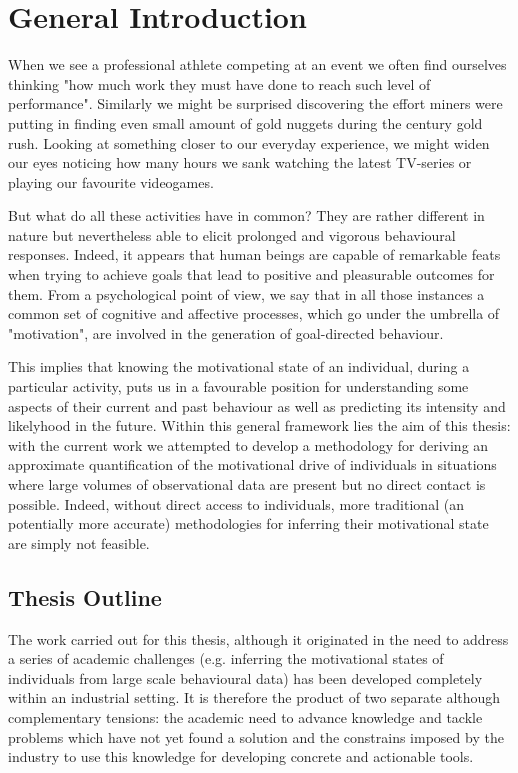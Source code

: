 \chapter{General Introduction}
\label{chapter_general_intro}

When we see a professional athlete competing at an event we often find ourselves thinking "how much work they must have done to reach such level of performance". Similarly we might be surprised discovering the effort miners were putting in finding even small amount of gold nuggets during the  century gold rush. Looking at something closer to our everyday experience, we might widen our eyes noticing how many hours we sank watching the latest TV-series or playing our favourite videogames. 

But what do all these activities have in common? They are rather different in nature but nevertheless able to elicit prolonged and vigorous behavioural responses. Indeed, it appears that human beings are capable of remarkable feats when trying to achieve goals that lead to positive and pleasurable outcomes for them. From a psychological point of view, we say that in all those instances a common set of cognitive and affective processes, which go under the umbrella of "motivation", are involved in the generation of goal-directed behaviour. 

This implies that knowing the motivational state of an individual, during a particular activity, puts us in a favourable position for understanding some aspects of their current and past behaviour as well as  predicting its intensity and likelyhood in the future. Within this general framework lies the aim of this thesis: with the current work we attempted to develop a methodology for deriving an approximate quantification of the motivational drive of individuals in situations where large volumes of observational data are present but no direct contact is possible. Indeed, without direct access to individuals, more traditional (an potentially more accurate) methodologies for inferring their motivational state are simply not feasible.

\section*{Thesis Outline}
The work carried out for this thesis, although it originated in the need to address a series of academic challenges (e.g. inferring the motivational states of individuals from large scale behavioural data) has been developed completely within an industrial setting. It is therefore the product of two separate although complementary tensions: the academic need to advance knowledge and tackle problems which have not yet found a solution and the constrains imposed by the industry to use this knowledge for developing concrete and actionable tools.

